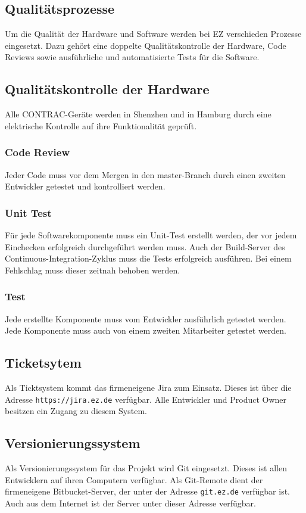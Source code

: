 \subsection{Qualitätsprozesse}
Um die Qualität der Hardware und Software werden bei EZ verschieden Prozesse eingesetzt. Dazu gehört eine doppelte Qualitätskontrolle der Hardware, Code Reviews sowie ausführliche und automatisierte Tests für die Software.
\subsection{Qualitätskontrolle der Hardware}
Alle CONTRAC-Geräte werden in Shenzhen und in Hamburg durch eine elektrische Kontrolle auf ihre Funktionalität geprüft.
\subsubsection{Code Review}
Jeder Code muss vor dem Mergen in den master-Branch durch einen zweiten Entwickler getestet und kontrolliert werden.
\subsubsection{Unit Test}
Für jede Softwarekomponente muss ein Unit-Test erstellt werden, der vor jedem Einchecken erfolgreich durchgeführt werden muss. Auch der Build-Server des Continuous-Integration-Zyklus muss die Tests erfolgreich ausführen. Bei einem Fehlschlag muss dieser zeitnah behoben werden.
\subsubsection{Test}
Jede erstellte Komponente muss vom Entwickler ausführlich getestet werden. Jede Komponente muss auch von einem zweiten Mitarbeiter getestet werden.
\subsection{Ticketsytem}
Als Ticktsystem kommt das firmeneigene Jira zum Einsatz. Dieses ist über die Adresse \texttt{https://jira.ez.de} verfügbar. Alle Entwickler und Product Owner besitzen ein Zugang zu diesem System.
\subsection{Versionierungssystem}
Als Versionierungssystem für das Projekt wird Git eingesetzt. Dieses ist allen Entwicklern auf ihren Computern verfügbar. Als Git-Remote dient der firmeneigene Bitbucket-Server, der unter der Adresse \texttt{git.ez.de} verfügbar ist. Auch aus dem Internet ist der Server unter dieser Adresse verfügbar.

